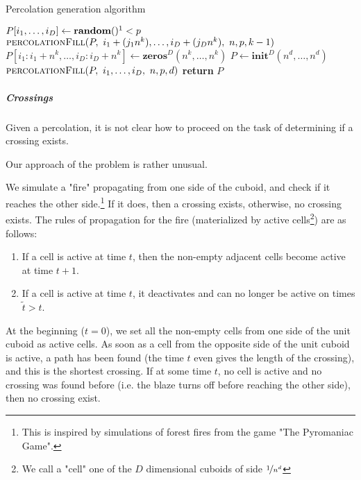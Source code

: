 \begin{algorithm}[!h]
	\caption{Percolation generation algorithm}\label{algo:percolationGeneration}
	\begin{algorithmic}[1]
				\State $P[i_1,\dots,i_D] \gets \textbf{random}()\footnotemark < p$ 
			\Else
						\State $\textsc{percolationFill}(P, \ i_1+(j_1 n^k),\dots,i_D+(j_D n^k), \ n, p, k-1)$ 
					\Else
						\State $P[i_1:i_1+n^k,\dots,i_D:i_D+n^k] \gets \textbf{zeros$^D$}(n^k,\dots,n^k)$ 
					\EndIf
				\EndFor
			\EndIf
		\EndProcedure
			\State $P \gets \textbf{init$^D$}(n^d,\dots,n^d)$
			\State $\textsc{percolationFill}(P, \ i_1,\dots,i_D, \ n, p, d)$ 
			\State \textbf{return} $P$
		\EndProcedure
	\end{algorithmic}
\end{algorithm}
\addtocounter{footnote}{-1}
\addtocounter{footnote}{-1}

\subparagraph{Crossings}\label{crossingAlgorithm}
Given a percolation, it is not clear how to proceed on the task of determining if a crossing exists.

Our approach of the problem is rather unusual.

We simulate a "fire" propagating from one side of the cuboid, and check if it reaches the other side.\footnote{This is inspired by simulations of forest fires from the game "The Pyromaniac Game"\cite{pyromaniacGame}.}
If it does, then a crossing exists, otherwise, no crossing exists.
The rules of propagation for the fire (materialized by active cells\footnote{We call a "cell" one of the $D$ dimensional cuboids of side $\nicefrac{1}{n^d}$}) are as follows:
\begin{enumerate}
	\item If a cell is active at time $t$, then the non-empty adjacent cells become active at time $t+1$.
	\item If a cell is active at time $t$, it deactivates and can no longer be active on times $\tilde{t}>t$.
\end{enumerate}
At the beginning ($t=0$), we set all the non-empty cells from one side of the unit cuboid as active cells.
As soon as a cell from the opposite side of the unit cuboid is active, a path has been found (the time $t$ even gives the length of the crossing), and this is the shortest crossing.
If at some time $t$, no cell is active and no crossing was found before (i.e. the blaze turns off before reaching the other side), then no crossing exist.

